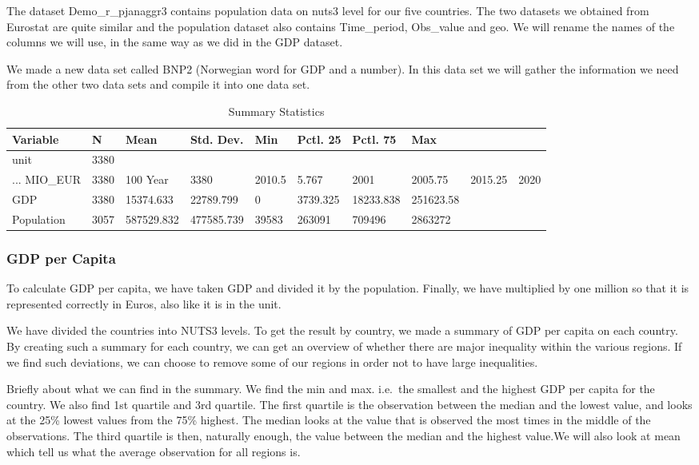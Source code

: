 \documentclass[
]{article}
\begin{document}
The dataset Demo\_r\_pjanaggr3 contains population data on nuts3 level
for our five countries. The two datasets we obtained from Eurostat are
quite similar and the population dataset also contains Time\_period,
Obs\_value and geo. We will rename the names of the columns we will use,
in the same way as we did in the GDP dataset.

We made a new data set called BNP2 (Norwegian word for GDP and a
number). In this data set we will gather the information we need from
the other two data sets and compile it into one data set.

\begin{table}

\caption{\label{tab:unnamed-chunk-1}Summary Statistics}
\centering
\begin{tabular}[t]{llllllll}
\toprule
Variable & N & Mean & Std. Dev. & Min & Pctl. 25 & Pctl. 75 & Max\\
\midrule
unit & 3380 &  &  &  &  &  & \\
... MIO_EUR & 3380 & 100%
Year & 3380 & 2010.5 & 5.767 & 2001 & 2005.75 & 2015.25 & 2020\\
GDP & 3380 & 15374.633 & 22789.799 & 0 & 3739.325 & 18233.838 & 251623.58\\
Population & 3057 & 587529.832 & 477585.739 & 39583 & 263091 & 709496 & 2863272\\
\bottomrule
\end{tabular}
\end{table}

\hypertarget{gdp-per-capita}{%
\subsubsection{GDP per Capita}\label{gdp-per-capita}}

To calculate GDP per capita, we have taken GDP and divided it by the
population. Finally, we have multiplied by one million so that it is
represented correctly in Euros, also like it is in the unit.

We have divided the countries into NUTS3 levels. To get the result by
country, we made a summary of GDP per capita on each country. By
creating such a summary for each country, we can get an overview of
whether there are major inequality within the various regions. If we
find such deviations, we can choose to remove some of our regions in
order not to have large inequalities.

Briefly about what we can find in the summary. We find the min and max.
i.e.~the smallest and the highest GDP per capita for the country. We
also find 1st quartile and 3rd quartile. The first quartile is the
observation between the median and the lowest value, and looks at the
25\% lowest values from the 75\% highest. The median looks at the value
that is observed the most times in the middle of the observations. The
third quartile is then, naturally enough, the value between the median
and the highest value.We will also look at mean which tell us what the
average observation for all regions is.
\end{document}
